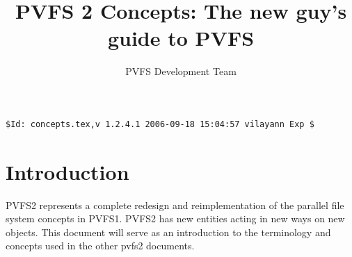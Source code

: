 \documentclass[10pt]{article} %
\title{PVFS 2 Concepts: The new guy's guide to PVFS}
\author{PVFS Development Team}
\begin{document}
\maketitle

\begin{verbatim}$Id: concepts.tex,v 1.2.4.1 2006-09-18 15:04:57 vilayann Exp $\end{verbatim}
\section{Introduction}

PVFS2 represents a complete redesign and reimplementation of the
parallel file system concepts in PVFS1.  PVFS2 has new entities acting
in new ways on new objects.  This document will serve as an introduction
to the terminology and concepts used in the other pvfs2 documents.

\end{document}
